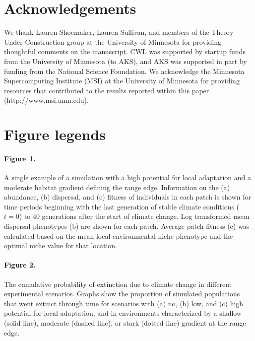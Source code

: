 \documentclass[12pt, oneside]{article}
\begin{document}
\section*{Acknowledgements}
We thank Lauren Shoemaker, Lauren Sullivan, and members of the Theory Under Construction group at the University of Minnesota for providing thoughtful comments on the manuscript. CWL was supported by startup funds from the University of Minnesota (to AKS), and AKS was supported in part by funding from the National Science Foundation. We acknowledge the Minnesota Supercomputing Institute (MSI) at the University of Minnesota for providing resources that contributed to the results reported within this paper (http://www.msi.umn.edu).




\newpage

\section*{Figure legends}
\paragraph{Figure 1.} A single example of a simulation with a high potential for local adaptation and a moderate habitat gradient defining the range edge. Information on the (a) abundance, (b) dispersal, and (c) fitness of individuals in each patch is shown for time periods beginning with the last generation of stable climate conditions ($t = 0$) to 40 generations after the start of climate change. Log transformed mean dispersal phenotypes (b) are shown for each patch. Average patch fitness (c) was calculated based on the mean local environmental niche phenotype and the optimal niche value for that location.

\paragraph{Figure 2.} The cumulative probability of extinction due to climate change in different experimental scenarios. Graphs show the proportion of simulated populations that went extinct through time for scenarios with (a) no, (b) low, and (c) high potential for local adaptation, and in environments characterized by a shallow (solid line), moderate (dashed line), or stark (dotted line) gradient at the range edge.
\end{document}
